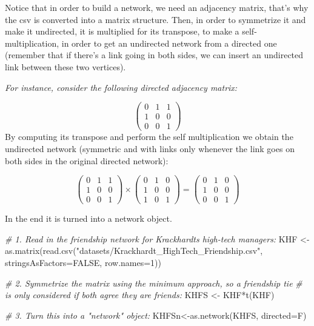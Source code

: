 \documentclass[
  notitlepage,
  onecolumn,
  openany]{book}
\newenvironment{Shaded}{\begin{snugshade}}{\end{snugshade}}
\newcommand{\AttributeTok}[1]{\textcolor[rgb]{0.77,0.63,0.00}{#1}}
\newcommand{\CommentTok}[1]{\textcolor[rgb]{0.56,0.35,0.01}{\textit{#1}}}
\newcommand{\ConstantTok}[1]{\textcolor[rgb]{0.00,0.00,0.00}{#1}}
\newcommand{\DecValTok}[1]{\textcolor[rgb]{0.00,0.00,0.81}{#1}}
\newcommand{\FunctionTok}[1]{\textcolor[rgb]{0.00,0.00,0.00}{#1}}
\newcommand{\NormalTok}[1]{#1}
\newcommand{\OtherTok}[1]{\textcolor[rgb]{0.56,0.35,0.01}{#1}}
\newcommand{\SpecialCharTok}[1]{\textcolor[rgb]{0.00,0.00,0.00}{#1}}
\newcommand{\StringTok}[1]{\textcolor[rgb]{0.31,0.60,0.02}{#1}}
\begin{document}
Notice that in order to build a network, we need an adjacency matrix, that's why the csv is converted into a matrix structure. Then, in order to symmetrize it and make it undirected, it is multiplied for its transpose, to make a self-multiplication, in order to get an undirected network from a directed one (remember that if there's a link going in both sides, we can insert an undirected link between these two vertices).

\emph{For instance, consider the following directed adjacency matrix:}

\[
\left( \begin{array}{ccc}
0 & 1 & 1 \\
1 & 0 & 0 \\
0 & 0 & 1 \end{array} \right)
\]
By computing its transpose and perform the self multiplication we obtain the undirected network (symmetric and with links only whenever the link goes on both sides in the original directed network):

\[
\left( \begin{array}{ccc}
0 & 1 & 1 \\
1 & 0 & 0 \\
0 & 0 & 1 \end{array} \right) \times 
\left( \begin{array}{ccc}
0 & 1 & 0 \\
1 & 0 & 0 \\
1 & 0 & 1 \end{array} \right) = 
\left( \begin{array}{ccc}
0 & 1 & 0 \\
1 & 0 & 0 \\
0 & 0 & 1 \end{array} \right)
\]

In the end it is turned into a network object.

\begin{Shaded}
\begin{Highlighting}[]
\CommentTok{\# 1. Read in the friendship network for Krackhardt\textquotesingle{}s high{-}tech managers:}
\NormalTok{KHF }\OtherTok{\textless{}{-}} \FunctionTok{as.matrix}\NormalTok{(}\FunctionTok{read.csv}\NormalTok{(}\StringTok{"datasets/Krackhardt\_HighTech\_Friendship.csv"}\NormalTok{,}
                          \AttributeTok{stringsAsFactors=}\ConstantTok{FALSE}\NormalTok{, }\AttributeTok{row.names=}\DecValTok{1}\NormalTok{))}


\CommentTok{\# 2. Symmetrize the matrix using the minimum approach, so a friendship tie}
\CommentTok{\# is only considered if both agree they are friends:}
\NormalTok{KHFS }\OtherTok{\textless{}{-}}\NormalTok{ KHF}\SpecialCharTok{*}\FunctionTok{t}\NormalTok{(KHF)}

\CommentTok{\# 3. Turn this into a "network" object:}
\NormalTok{KHFSn}\OtherTok{\textless{}{-}}\FunctionTok{as.network}\NormalTok{(KHFS, }\AttributeTok{directed=}\NormalTok{F)}
\end{Highlighting}
\end{Shaded}
\end{document}
